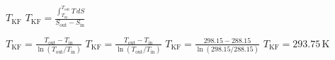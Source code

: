 \( T_{\text{KF}} \)  
\( T_{\text{KF}} = \frac{\int_{T_{\text{in}}}^{T_{\text{out}}} T \, dS}{S_{\text{out}} - S_{\text{in}}} \)  

\( T_{\text{KF}} = \frac{T_{\text{out}} - T_{\text{in}}}{\ln(T_{\text{out}} / T_{\text{in}})} \)  
\( T_{\text{KF}} = \frac{T_{\text{out}} - T_{\text{in}}}{\ln(T_{\text{out}} / T_{\text{in}})} \)  
\( T_{\text{KF}} = \frac{298.15 - 288.15}{\ln(298.15 / 288.15)} \)  
\( T_{\text{KF}} = 293.75 \, \text{K} \)